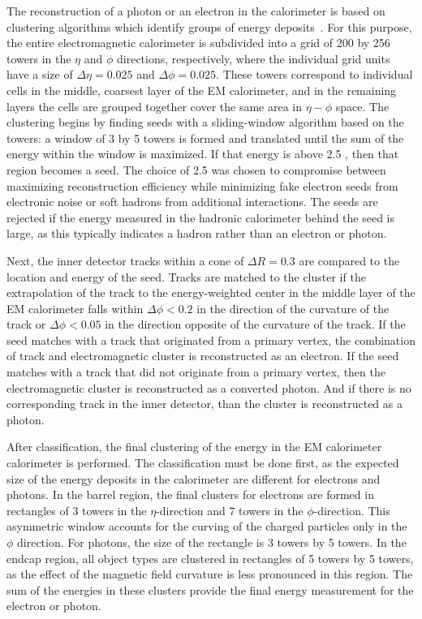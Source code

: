 The reconstruction of a photon or an electron in the calorimeter is based on clustering algorithms which identify groups of energy deposits~\cite{PERF-2013-03, ATLAS-CONF-2014-032, ATLAS-CONF-2012-123}.
For this purpose, the entire electromagnetic calorimeter is subdivided into a grid of 200 by 256 towers in the $\eta$ and $\phi$ directions, respectively, where the individual grid units have a size of $\Delta\eta = 0.025$ and $\Delta\phi = 0.025$.
These towers correspond to individual cells in the middle, coarsest layer of the \ac{EM} calorimeter, and in the remaining layers the cells are grouped together cover the same area in $\eta-\phi$ space.
The clustering begins by finding seeds with a sliding-window algorithm based on the towers: a window of 3 by 5 towers is formed and translated until the sum of the energy within the window is maximized.
If that energy is above 2.5 \GeV, then that region becomes a seed.
The choice of 2.5 \GeV was chosen to compromise between maximizing reconstruction efficiency while minimizing fake electron seeds from electronic noise or soft hadrons from additional interactions.
The seeds are rejected if the energy measured in the hadronic calorimeter behind the seed is large, as this typically indicates a hadron rather than an electron or photon.

Next, the inner detector tracks within a cone of $\Delta R = 0.3$ are compared to the location and energy of the seed.
Tracks are matched to the cluster if the extrapolation of the track to the energy-weighted center in the middle layer of the \ac{EM} calorimeter falls within $\Delta\phi < 0.2$ in the direction of the curvature of the track or $\Delta\phi < 0.05$ in the direction opposite of the curvature of the track.
If the seed matches with a track that originated from a primary vertex, the combination of track and electromagnetic cluster is reconstructed as an electron.
If the seed matches with a track that did not originate from a primary vertex, then the electromagnetic cluster is reconstructed as a converted photon.
And if there is no corresponding track in the inner detector, than the cluster is reconstructed as a photon.

After classification, the final clustering of the energy in the \ac{EM} calorimeter calorimeter is performed.
The classification must be done first, as the expected size of the energy deposits in the calorimeter are different for electrons and photons.
In the barrel region, the final clusters for electrons are formed in rectangles of 3 towers in the $\eta$-direction and 7 towers in the $\phi$-direction.
This asymmetric window accounts for the curving of the charged particles only in the $\phi$ direction.
For photons, the size of the rectangle is 3 towers by 5 towers.
In the endcap region, all object types are clustered in rectangles of 5 towers by 5 towers, as the effect of the magnetic field curvature is less pronounced in this region.
The sum of the energies in these clusters provide the final energy measurement for the electron or photon.

